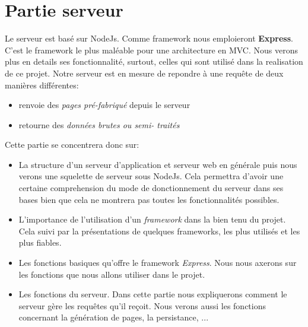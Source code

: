 \chapter{Partie serveur}
Le serveur est basé sur NodeJs. Comme framework nous emploieront \textbf{Express}. C'est le framework le plus maléable pour une architecture en MVC. Nous verons plus en details ses fonctionnalité, surtout, celles qui sont utilisé dans la realisation de ce projet.
Notre serveur est en mesure de repondre à une requête de deux manières différentes:
\begin{itemize}
	\item renvoie des \textit{pages pré-fabriqué} depuis le serveur
	\item retourne des \textit{données brutes ou semi- traités}
\end{itemize}
Cette partie se concentrera donc sur:
\begin{itemize}
	\item La structure d'un serveur d'application et serveur web en générale puis nous verons une squelette de serveur sous NodeJs. Cela permettra d'avoir une certaine comprehension du mode de donctionnement du serveur dans ses bases bien que cela ne montrera pas toutes les fonctionnalités possibles.
	\item L'importance de l'utilisation d'un \textit{framework} dans la bien tenu du projet. Cela suivi par la présentations de quelques frameworks, les plus utilisés et les plus fiables.
	\item Les fonctions basiques qu'offre le framework \textit{Express}. Nous nous axerons sur les fonctions que nous allons utiliser dans le projet.
	\item Les fonctions du serveur. Dans cette partie nous expliquerons comment le serveur gère les requêtes qu'il reçoit. Nous verons aussi les fonctions concernant la génération de pages, la persistance, ...
\end{itemize}

